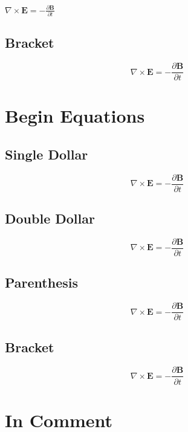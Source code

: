 {{{{$\nabla \times \mathbf{E} = - \frac{\partial \mathbf{B}}{\partial t}$

\chapter{Bracket}
\label{bracket}

\[\nabla \times \mathbf{E} = - \frac{\partial \mathbf{B}}{\partial t}\]

\part{Begin Equations}
\label{beginequations}

\chapter{Single Dollar}
\label{singledollar}

\begin{equation}\nabla \times \mathbf{E} = - \frac{\partial \mathbf{B}}{\partial t}\end{equation}

\chapter{Double Dollar}
\label{doubledollar}

\begin{equation}\nabla \times \mathbf{E} = - \frac{\partial \mathbf{B}}{\partial t}\end{equation}

\chapter{Parenthesis}
\label{parenthesis}

\begin{equation}\nabla \times \mathbf{E} = - \frac{\partial \mathbf{B}}{\partial t}\end{equation}

\chapter{Bracket}
\label{bracket}

\begin{equation}\nabla \times \mathbf{E} = - \frac{\partial \mathbf{B}}{\partial t}\end{equation}

\part{In Comment}
\label{incomment}

}}}}

